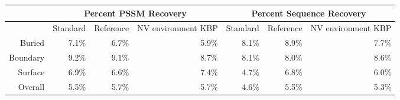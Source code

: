 
\begin{tabular}{|r|r|r|r|r|r|r|}
\hline
 & \multicolumn{3}{c}{Percent PSSM Recovery} & \multicolumn{3}{|c|}{Percent Sequence Recovery}\\
\hline
  & Standard & Reference & NV environment KBP & Standard & Reference & NV environment KBP \\
\hline
Buried & 7.1\% & 6.7\% & 5.9\% & 8.1\% & 8.9\% & 7.7\%\\
\hline
Boundary & 9.2\% & 9.1\% & 8.7\% & 8.1\% & 8.0\% & 8.6\%\\
\hline
Surface & 6.9\% & 6.6\% & 7.4\% & 4.7\% & 6.8\% & 6.0\%\\
\hline
Overall & 5.5\% & 5.7\% & 5.7\% & 4.6\% & 5.5\% & 5.3\%\\
\hline
\end{tabular}